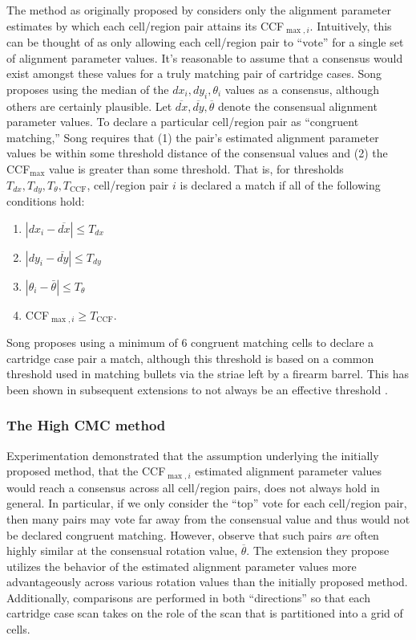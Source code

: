 The method as originally proposed by \citet{song_proposed_2013}
considers only the alignment parameter estimates by which each
cell/region pair attains its CCF\(_{\max,i}\). Intuitively, this can be
thought of as only allowing each cell/region pair to ``vote'' for a
single set of alignment parameter values. It's reasonable to assume that
a consensus would exist amongst these values for a truly matching pair
of cartridge cases. Song proposes using the median of the
\(dx_i, dy_i, \theta_i\) values as a consensus, although others are
certainly plausible. Let
\(\overline{dx}, \overline{dy}, \overline{\theta}\) denote the
consensual alignment parameter values. To declare a particular
cell/region pair as ``congruent matching,'' Song requires that (1) the
pair's estimated alignment parameter values be within some threshold
distance of the consensual values and (2) the CCF\(_{\max}\) value is
greater than some threshold. That is, for thresholds
\(T_{dx}, T_{dy}, T_{\theta},T_{\text{CCF}}\), cell/region pair \(i\) is
declared a match if all of the following conditions hold:

\begin{enumerate}
\item $|dx_i - \overline{dx}| \leq T_{dx}$ \\
\item $|dy_i - \overline{dy}| \leq T_{dy}$ \\
\item $|\theta_i - \bar{\theta}| \leq T_{\theta}$ \\
\item CCF$_{\max,i} \geq T_{\text{CCF}}$.
\end{enumerate}

Song proposes using a minimum of 6 congruent matching cells to declare a
cartridge case pair a match, although this threshold is based on a
common threshold used in matching bullets via the striae left by a
firearm barrel. This has been shown in subsequent extensions to not
always be an effective threshold \citep{chen_convergence_2017}.

\hypertarget{highCMCMethod}{%
\subsubsection{The High CMC method}\label{highCMCMethod}}

Experimentation demonstrated that the assumption underlying the
initially proposed method, that the CCF\(_{\max,i}\) estimated alignment
parameter values would reach a consensus across all cell/region pairs,
does not always hold in general. In particular, if we only consider the
``top'' vote for each cell/region pair, then many pairs may vote far
away from the consensual value and thus would not be declared congruent
matching. However, \citet{tong_improved_2015} observe that such pairs
\emph{are} often highly similar at the consensual rotation value,
\(\overline{\theta}\). The extension they propose utilizes the behavior
of the estimated alignment parameter values more advantageously across
various rotation values than the initially proposed method.
Additionally, comparisons are performed in both ``directions'' so that
each cartridge case scan takes on the role of the scan that is
partitioned into a grid of cells.

